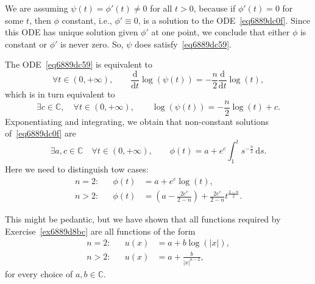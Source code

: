\documentclass[a4paper,9pt]{amsart}
\newcommand{\C}{\mathbb{C}}	%
\newcommand{\dd}{\mathrm{d}}	%
\newcommand{\did}{\,\mathrm{d}}	%
\newcommand{\abs}[1]{\left\lvert #1 \right\rvert}
\theoremstyle{plain}
\theoremstyle{definition}
\theoremstyle{remark}
\begin{document}
We are assuming $\psi(t) = \phi'(t)\neq0$ for all $t>0$, because if $\phi'(t)=0$ for some $t$, then $\phi$ constant, i.e., $\phi'\equiv0$, is a solution to the ODE~\eqref{eq6889dc0f}.
Since this ODE has unique solution given $\phi'$ at one point, we conclude that either $\phi$ is constant or $\phi'$ is never zero.
So, $\psi$ does satisfy~\eqref{eq6889dc59}.

The ODE~\eqref{eq6889dc59} is equivalent to
\begin{equation}
	\forall t\in(0,+\infty),\qquad
	\frac{\dd}{\dd t} \log(\psi(t))
	= - \frac{n}{2} \frac{\dd}{\dd t} \log(t) ,
\end{equation}
which is in turn equivalent to
\begin{equation}
	\exists c\in\C,\quad\forall t\in(0,+\infty),\qquad
	\log(\psi(t))  = - \frac{n}{2} \log(t) + c .
\end{equation}
Exponentiating and integrating, we obtain that non-constant solutions of~\eqref{eq6889dc0f} are
\begin{equation}
	\exists a,c\in\C\quad
	\forall t\in(0,+\infty),\qquad
	\phi(t) = a + e^c \int_1^t s^{-\frac{n}{2}} \did s .
\end{equation}
Here we need to distinguish tow cases:
\begin{align}
	n=2: && \phi(t) &= a + e^c \log(t) , \\
	n>2: && \phi(t) &= \left( a - \frac{2e^c}{2-n} \right) + \frac{2e^c}{2-n} t^{\frac{2-n}{2}} .
\end{align}

This might be pedantic, but we have shown that all functions required by Exercise~\ref{ex6889d8bc} are all functions of the form
\begin{align}
	n=2: && u(x) &= a + b \log(\abs{x}) , \\
	n>2: && u(x) &= a + \frac{b}{\abs{x}^{n-2}} ,
\end{align}
for every choice of $a,b\in\C$.
\end{document}
